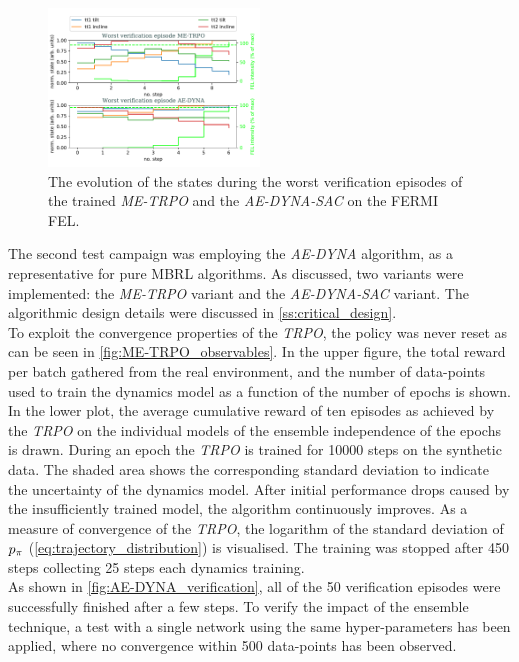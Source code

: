 \documentclass[
reprint,
amsmath,amssymb,amsfonts,clevref,
aps,
prstab,
]{revtex4-2}
\begin{document}
	\begin{figure}
		\centering
		\includegraphics*[width=0.5\textwidth]{Figures/Worst_episode_MBRL.pdf}
		\caption{The evolution of the states during the worst verification episodes of the trained \emph{ME-TRPO} and the \emph{AE-DYNA-SAC} on the FERMI FEL.}
		\label{fig:Worst_episode_MBRL}
	\end{figure}
	The second test campaign was employing the \emph{AE-DYNA} algorithm, as a representative for pure MBRL algorithms. As discussed, two variants were implemented: the \emph{ME-TRPO} variant and the \emph{AE-DYNA-SAC} variant. The algorithmic design details were discussed in \cref{ss:critical_design}. 
	\\ To exploit the convergence properties of the \emph{TRPO}, the policy was never reset as can be seen in \cref{fig:ME-TRPO_observables}. In the upper figure, the total reward per batch gathered from the real environment, and the number of data-points used to train the dynamics model as a function of the number of epochs is shown. In the lower plot, the average cumulative reward of ten episodes as achieved by the \emph{TRPO} on the individual models of the ensemble independence of the epochs is drawn. During an epoch the \emph{TRPO} is trained for 10000 steps on the synthetic data. The shaded area shows the corresponding standard deviation to indicate the uncertainty of the dynamics model. After initial performance drops caused by the insufficiently trained model, the algorithm continuously improves. As a measure of convergence of the \emph{TRPO}, the logarithm of the standard deviation of $p_\pi$ (\cref{eq:trajectory_distribution}) is visualised. The training was stopped after 450 steps collecting 25 steps each dynamics training.
	\\ As shown in \cref{fig:AE-DYNA_verification}, all of the 50 verification episodes were successfully finished after a few steps. To verify the impact of the ensemble technique, a test with a single network using the same hyper-parameters has been applied, where no convergence within 500 data-points has been observed. \\
\end{document}
